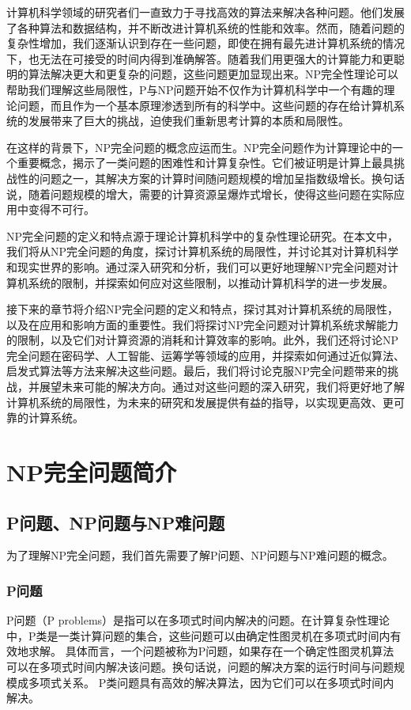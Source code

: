 \documentclass[UTF8,openany,zihao=5]{ctexbook}
\begin{document}
计算机科学领域的研究者们一直致力于寻找高效的算法来解决各种问题。他们发展了各种算法和数据结构，并不断改进计算机系统的性能和效率。然而，随着问题的复杂性增加，我们逐渐认识到存在一些问题，即使在拥有最先进计算机系统的情况下，也无法在可接受的时间内得到准确解答。随着我们用更强大的计算能力和更聪明的算法解决更大和更复杂的问题，这些问题更加显现出来。NP完全性理论可以帮助我们理解这些局限性，P与NP问题开始不仅作为计算机科学中一个有趣的理论问题，而且作为一个基本原理渗透到所有的科学中。\cite{bi:FL}这些问题的存在给计算机系统的发展带来了巨大的挑战，迫使我们重新思考计算的本质和局限性。

在这样的背景下，NP完全问题的概念应运而生。NP完全问题作为计算理论中的一个重要概念，揭示了一类问题的困难性和计算复杂性。它们被证明是计算上最具挑战性的问题之一，其解决方案的计算时间随问题规模的增加呈指数级增长。换句话说，随着问题规模的增大，需要的计算资源呈爆炸式增长，使得这些问题在实际应用中变得不可行。

NP完全问题的定义和特点源于理论计算机科学中的复杂性理论研究。在本文中，我们将从NP完全问题的角度，探讨计算机系统的局限性，并讨论其对计算机科学和现实世界的影响。通过深入研究和分析，我们可以更好地理解NP完全问题对计算机系统的限制，并探索如何应对这些限制，以推动计算机科学的进一步发展。

接下来的章节将介绍NP完全问题的定义和特点，探讨其对计算机系统的局限性，以及在应用和影响方面的重要性。我们将探讨NP完全问题对计算机系统求解能力的限制，以及它们对计算资源的消耗和计算效率的影响。此外，我们还将讨论NP完全问题在密码学、人工智能、运筹学等领域的应用，并探索如何通过近似算法、启发式算法等方法来解决这些问题。最后，我们将讨论克服NP完全问题带来的挑战，并展望未来可能的解决方向。通过对这些问题的深入研究，我们将更好地了解计算机系统的局限性，为未来的研究和发展提供有益的指导，以实现更高效、更可靠的计算系统。

\chapter{NP完全问题简介}



\section{P问题、NP问题与NP难问题}

为了理解NP完全问题，我们首先需要了解P问题、NP问题与NP难问题的概念。
\subsection{P问题}
P问题（P problems）是指可以在多项式时间内解决的问题。在计算复杂性理论中，P类是一类计算问题的集合，这些问题可以由确定性图灵机在多项式时间内有效地求解。
具体而言，一个问题被称为P问题，如果存在一个确定性图灵机算法可以在多项式时间内解决该问题。换句话说，问题的解决方案的运行时间与问题规模成多项式关系。
P类问题具有高效的解决算法，因为它们可以在多项式时间内解决。
\end{document}

